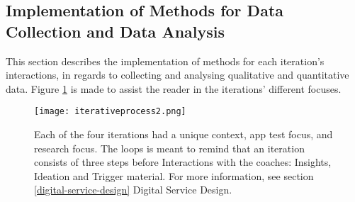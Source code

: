 \subsection{Implementation of Methods for Data Collection and Data Analysis}

This section describes the implementation of methods for each iteration's interactions, in regards to collecting and analysing qualitative and quantitative data. Figure \ref{fig:methods} is made to assist the reader in the iterations' different focuses.


\begin{figure}[h]
    \centering
    \texttt{[image: iterativeprocess2.png]}
    \caption{Each of the four iterations had a unique context, app test focus, and research focus. The loops is meant to remind that an iteration consists of three steps before Interactions with the coaches: Insights, Ideation and Trigger material. For more information, see section \ref{digital-service-design} Digital Service Design.}
    \label{fig:methods}
\end{figure}

%
%
%
%
%
%
%
%
%
%
%
%
%
%
%

%

%

%

%
